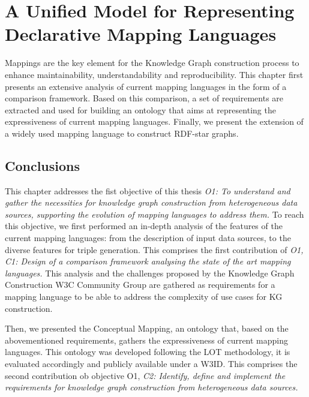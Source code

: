 
\chapter{A Unified Model for Representing Declarative Mapping Languages}
\label{chapter:mappings}

Mappings are the key element for the Knowledge Graph construction process to enhance maintainability, understandability and reproducibility. This chapter first presents an extensive analysis of current mapping languages in the form of a comparison framework. Based on this comparison, a set of requirements are extracted and used for building an ontology that aims at representing the expressiveness of current mapping languages. Finally, we present the extension of a widely used mapping language to construct RDF-star graphs.








\section{Conclusions}

This chapter addresses the fist objective of this thesis \textit{O1: To understand and gather the necessities for knowledge graph construction from heterogeneous data sources, supporting the evolution of mapping languages to address them.} 
To reach this objective, we first performed an in-depth analysis of the features of the current mapping languages: from the description of input data sources, to the diverse features for triple generation. This comprises the first contribution of \textit{O1, C1: Design of a comparison framework analysing the state of the art mapping languages.}
This analysis and the challenges proposed by the Knowledge Graph Construction W3C Community Group are gathered as requirements for a mapping language to be able to address the complexity of use cases for KG construction. 

Then, we presented the Conceptual Mapping, an ontology that, based on the abovementioned requirements, gathers the expressiveness of current mapping languages. This ontology was developed following the LOT methodology, it is evaluated accordingly and publicly available under a W3ID. 
This comprises the second contribution ob objective O1, \textit{C2: Identify, define and implement the requirements for knowledge graph construction from heterogeneous data sources.}

